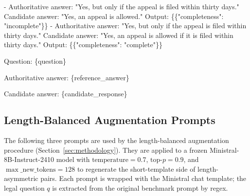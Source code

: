 \documentclass{article}
\theoremstyle{plain}
\theoremstyle{definition}
\theoremstyle{remark}
\begin{document}
{\begin{minipage}{0.94\textwidth}
- Authoritative answer: "Yes, but only if the appeal is filed within thirty days."\newline
\hspace*{2em}Candidate answer: "Yes, an appeal is allowed."\newline
\hspace*{2em}Output: \{\{"completeness": "incomplete"\}\}\newline
- Authoritative answer: "Yes, but only if the appeal is filed within thirty days."\newline
\hspace*{2em}Candidate answer: "Yes, an appeal is allowed if it is filed within thirty days."\newline
\hspace*{2em}Output: \{\{"completeness": "complete"\}\}\par
\vspace{0.55em}
Question:\newline
\textasciigrave{}\textasciigrave{}\textasciigrave{}\newline
\{question\}\newline
\textasciigrave{}\textasciigrave{}\textasciigrave{}\par
\vspace{0.55em}
Authoritative answer:\newline
\textasciigrave{}\textasciigrave{}\textasciigrave{}\newline
\{reference\_answer\}\newline
\textasciigrave{}\textasciigrave{}\textasciigrave{}\par
\vspace{0.55em}
Candidate answer:\newline
\textasciigrave{}\textasciigrave{}\textasciigrave{}\newline
\{candidate\_response\}\newline
\textasciigrave{}\textasciigrave{}\textasciigrave{}\par
\end{minipage}%
}
\endgroup
\clearpage

\label{app:augmentation-prompts}
\subsection*{Length-Balanced Augmentation Prompts}
\label{sec:Length-Balanced}

The following three prompts are used by the length-balanced augmentation procedure (Section~\ref{sec:methodology}). They are applied to a frozen Ministral-8B-Instruct-2410 model with $\text{temperature}=0.7$, $\text{top-}p=0.9$, and $\max\_\text{new\_tokens}=128$ to regenerate the short-template side of length-asymmetric pairs. Each prompt is wrapped with the Ministral chat template; the legal question $q$ is extracted from the original benchmark prompt by regex.
\end{document}
